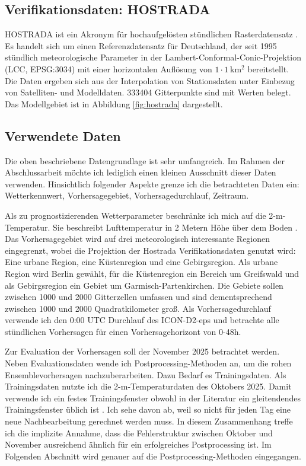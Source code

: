 \documentclass{article}
\numberwithin{equation}{section}
\begin{document}
\subsection{Verifikationsdaten: HOSTRADA}
HOSTRADA ist ein Akronym für hochaufgelösten stündlichen Rasterdatensatz \parencite{krahenmann_high-resolution_2018}. Es handelt sich um einen Referenzdatensatz für Deutschland, der seit 1995 stündlich meteorologische Parameter in der Lambert-Conformal-Conic-Projektion (LCC, EPSG:3034) mit einer horizontalen Auflösung von $1\cdot1\ \mathrm{km^2}$ bereitstellt. Die Daten ergeben sich aus der Interpolation von Stationsdaten unter Einbezug von Satelliten- und Modelldaten. 333404 Gitterpunkte sind mit Werten belegt. Das Modellgebiet ist in Abbildung \ref{fig:hostrada} dargestellt.

\subsection{Verwendete Daten} \label{sec:useddata}
Die oben beschriebene Datengrundlage ist sehr umfangreich. Im Rahmen der Abschlussarbeit möchte ich lediglich einen kleinen Ausschnitt dieser Daten verwenden. Hinsichtlich folgender Aspekte grenze ich die betrachteten Daten ein: Wetterkennwert, Vorhersagegebiet, Vorhersagedurchlauf, Zeitraum.

Als zu prognostizierenden Wetterparameter beschränke ich mich auf die 2-m-Temperatur. Sie beschreibt Lufttemperatur in 2 Metern Höhe über dem Boden \parencite{dwd_2m_temperatur}. Das Vorhersagegebiet wird auf drei meteorologisch interessante Regionen eingegrenzt, wobei die Projektion der Hostrada Verifikationsdaten genutzt wird: Eine urbane Region, eine Küstenregion und eine Gebirgsregion. Als urbane Region wird Berlin gewählt, für die Küstenregion ein Bereich um Greifswald und als Gebirgsregion ein Gebiet um Garmisch-Partenkirchen. Die Gebiete sollen zwischen 1000 und 2000 Gitterzellen umfassen und sind dementsprechend zwischen 1000 und 2000 Quadratkilometer groß. Als Vorhersagedurchlauf verwende ich den 0:00 UTC Durchlauf des ICON-D2-eps und betrachte alle stündlichen Vorhersagen für einen Vorhersagehorizont von 0-48h.

Zur Evaluation der Vorhersagen soll der November 2025 betrachtet werden. Neben Evaluationsdaten wende ich Postprocessing-Methoden an, um die rohen Ensemblevorhersagen nachzuberarbeiten. Dazu Bedarf es Trainingsdaten.  Als Trainingsdaten nutzte ich die 2-m-Temperaturdaten des Oktobers 2025. Damit verwende ich ein festes Trainingsfenster obwohl in der Literatur ein gleitendendes Trainingsfenster üblich ist \parencite{vannitsem_statistical_2021, climaguidelines}. Ich sehe davon ab, weil so nicht für jeden Tag eine neue Nachbearbeitung gerechnet werden muss. In diesem Zusammenhang treffe ich die implizite Annahme, dass die Fehlerstruktur zwischen Oktober und November ausreichend ähnlich für ein erfolgreiches Postprocessing ist. Im Folgenden Abschnitt wird genauer auf die Postprocessing-Methoden eingegangen.
\end{document}
